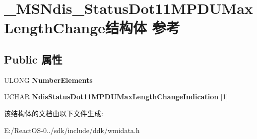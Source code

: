 \hypertarget{struct___m_s_ndis___status_dot11_m_p_d_u_max_length_change}{}\section{\+\_\+\+M\+S\+Ndis\+\_\+\+Status\+Dot11\+M\+P\+D\+U\+Max\+Length\+Change结构体 参考}
\label{struct___m_s_ndis___status_dot11_m_p_d_u_max_length_change}
\subsection*{Public 属性}
\begin{DoxyCompactItemize}
\item 
\mbox{\label{struct___m_s_ndis___status_dot11_m_p_d_u_max_length_change_a9a033698764516dd557a5e65605ffb1e}} 
U\+L\+O\+NG {\bfseries Number\+Elements}
\item 
\mbox{\label{struct___m_s_ndis___status_dot11_m_p_d_u_max_length_change_a75bb47813ca57b2657b89721fe312ed3}} 
U\+C\+H\+AR {\bfseries Ndis\+Status\+Dot11\+M\+P\+D\+U\+Max\+Length\+Change\+Indication} \mbox{[}1\mbox{]}
\end{DoxyCompactItemize}


该结构体的文档由以下文件生成\+:\begin{DoxyCompactItemize}
\item 
E\+:/\+React\+O\+S-\/0../sdk/include/ddk/wmidata.\+h\end{DoxyCompactItemize}
